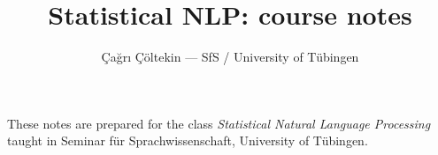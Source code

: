 \documentclass[nobib,%
               a4paper,%
               notitlepage,%
               justified]{tufte-book}
\title{Statistical NLP: course notes}
\author[Ç. Çöltekin]{Çağrı Çöltekin --- SfS / University of Tübingen}
\begin{document}
\frontmatter

\maketitle


\vfill
These notes are prepared for the class \emph{Statistical Natural Language Processing}
taught in Seminar für Sprachwissenschaft, University of Tübingen.

\vfill
\noindent\doclicenseLongText%
\marginnote[-2ex]{%
  \doclicenseImage%
}

\tableofcontents

\mainmatter

%




%




%


%
%

%
%
%
%
%
%
%

%
%
%
%
%
%

\printbibliography
\appendix
\end{document}
